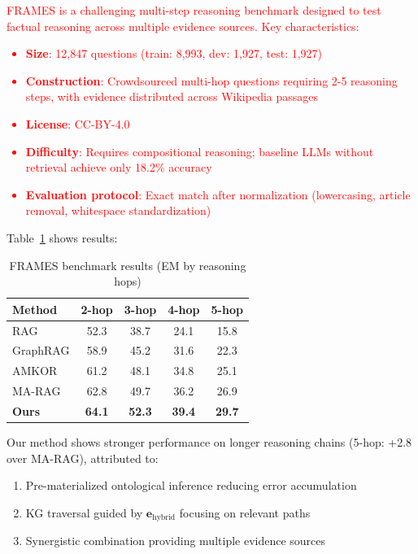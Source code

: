 \documentclass[10pt,twocolumn]{article}
\newcommand{\revisioncritical}[1]{\textcolor{red}{#1}}
\begin{document}
\revisioncritical{FRAMES \cite{krishna2024frames} is a challenging multi-step reasoning benchmark designed to test factual reasoning across multiple evidence sources. Key characteristics:

\begin{itemize}
    \item \textbf{Size}: 12,847 questions (train: 8,993, dev: 1,927, test: 1,927)
    \item \textbf{Construction}: Crowdsourced multi-hop questions requiring 2-5 reasoning steps, with evidence distributed across Wikipedia passages
    \item \textbf{License}: CC-BY-4.0
    \item \textbf{Difficulty}: Requires compositional reasoning; baseline LLMs without retrieval achieve only 18.2\% accuracy
    \item \textbf{Evaluation protocol}: Exact match after normalization (lowercasing, article removal, whitespace standardization)
\end{itemize}
}

Table~\ref{tab:frames} shows results:

\begin{table}[t]
\centering
\caption{FRAMES benchmark results (EM by reasoning hops)}
\label{tab:frames}
\small
\begin{tabular}{@{}lcccc@{}}
\toprule
\textbf{Method} & \textbf{2-hop} & \textbf{3-hop} & \textbf{4-hop} & \textbf{5-hop} \\
\midrule
RAG & 52.3 & 38.7 & 24.1 & 15.8 \\
GraphRAG & 58.9 & 45.2 & 31.6 & 22.3 \\
AMKOR & 61.2 & 48.1 & 34.8 & 25.1 \\
MA-RAG & 62.8 & 49.7 & 36.2 & 26.9 \\
\midrule
\textbf{Ours} & \textbf{64.1} & \textbf{52.3} & \textbf{39.4} & \textbf{29.7} \\
\bottomrule
\end{tabular}
\end{table}

Our method shows stronger performance on longer reasoning chains (5-hop: +2.8 over MA-RAG), attributed to:
\begin{enumerate}
    \item Pre-materialized ontological inference reducing error accumulation
    \item KG traversal guided by $\mathbf{e}_{\text{hybrid}}$ focusing on relevant paths
    \item Synergistic combination providing multiple evidence sources
\end{enumerate}
\end{document}
